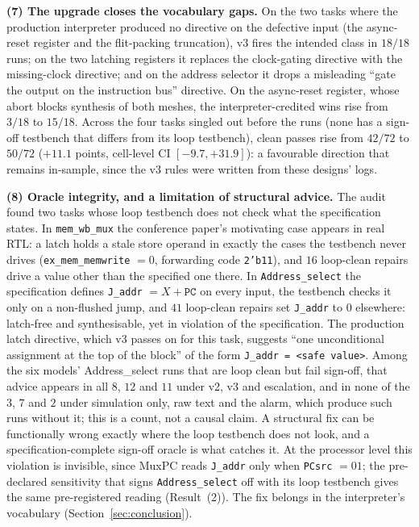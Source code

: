 \documentclass[11pt]{article}
\begin{document}
\textbf{(7) The upgrade closes the vocabulary gaps.} On the two tasks where the production interpreter produced no
directive on the defective input (the async-reset register and the
flit-packing truncation), v3 fires the intended class in $18/18$ runs; on the
two latching registers it replaces the clock-gating directive with the
missing-clock directive; and on the address selector it drops a misleading
``gate the output on the instruction bus'' directive. On the async-reset
register, whose abort blocks synthesis of both meshes, the interpreter-credited
wins rise from $3/18$ to $15/18$. Across the four tasks singled out before the
runs (none has a sign-off testbench that differs from its loop testbench),
clean passes rise from $42/72$ to $50/72$ ($+11.1$ points, cell-level CI
$[-9.7, +31.9]$): a favourable direction that remains in-sample, since the v3
rules were written from these designs' logs.

\textbf{(8) Oracle integrity, and a limitation of structural advice.} The audit
found two tasks whose loop testbench does not check what the specification
states. In \texttt{mem\_wb\_mux} the conference paper's motivating case
appears in real RTL: a latch holds a stale store operand in exactly the cases
the testbench never drives (\texttt{ex\_mem\_memwrite} $=0$, forwarding code
\texttt{2'b11}), and $16$ loop-clean repairs drive a value other than the
specified one there. In \texttt{Address\_select} the specification defines
\texttt{J\_addr} $= X + \texttt{PC}$ on every input, the testbench checks it
only on a non-flushed jump, and $41$ loop-clean repairs set \texttt{J\_addr} to
$0$ elsewhere: latch-free and synthesisable, yet in violation of the
specification. The production latch
directive, which v3 passes on for this task, suggests ``one unconditional
assignment at the top of the block'' of the form \texttt{J\_addr = <safe
value>}. Among the six models' Address\_select runs that are loop clean but
fail sign-off, that advice appears in all $8$, $12$ and $11$ under v2, v3 and
escalation, and in none of the $3$, $7$ and $2$ under simulation only, raw text
and the alarm, which produce such runs without it; this is a count, not a
causal claim. A structural fix can be functionally wrong exactly where the loop
testbench does not look, and a specification-complete sign-off oracle is what
catches it. At the processor level this violation is invisible, since MuxPC
reads \texttt{J\_addr} only when \texttt{PCsrc} $= 01$; the pre-declared
sensitivity that signs \texttt{Address\_select} off with its loop testbench
gives the same pre-registered reading (Result~(2)). The fix belongs in the
interpreter's vocabulary (Section~\ref{sec:conclusion}).
\end{document}
